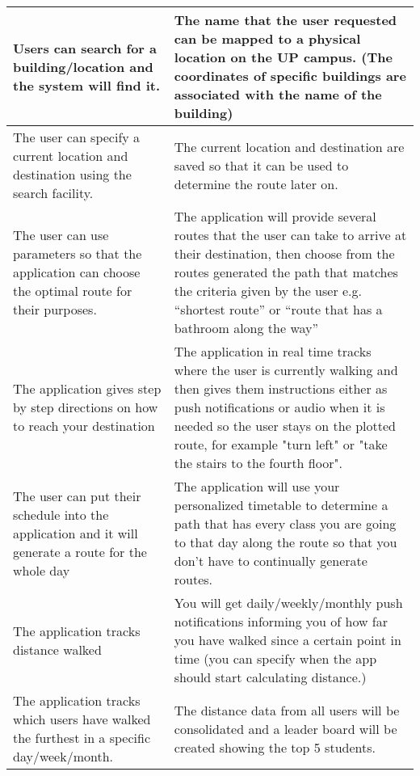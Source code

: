 \documentclass[a4paper,12pt]{article}
\begin{document}
\begin{table}[!htbp]
\begin{tabular}{|L|L|}
				\\
				\hline
				Users can search for a building/location and the system will find it. & The name that the user requested can be mapped to a physical location on the UP campus. (The coordinates of specific buildings are associated with the name of the building)
				\\
				\hline
				The user can specify a current location and destination using the search facility. & The current location and destination are saved so that it can be used to determine the route later on. 
				\\
				\hline
				The user can use parameters so that the application can choose the optimal route for their purposes. & The application will provide several routes that the user can take to arrive at their destination, then choose from the routes generated the path that matches the criteria given by the user e.g. “shortest route” or “route that has a bathroom along the way”
				\\
				\hline
				The application gives step by step directions on how to reach your destination & The application in real time tracks where the user is currently walking and then gives them instructions either as push notifications or audio when it is needed so the user stays on the plotted route, for example "turn left" or "take the stairs to the fourth floor". 
				\\
				\hline
				The user can put their schedule into the application and it will generate a route for the whole day & The application will use your personalized timetable to determine a path that has every class you are going to that day along the route so that you don’t have to continually generate routes.
				\\
				\hline
				The application tracks distance walked & You will get daily/weekly/monthly push notifications informing you of how far you have walked since a certain point in time (you can specify when the app should start calculating distance.)
				\\
				\hline
				The application tracks which users have walked the furthest in a specific day/week/month. & The distance data from all users will be consolidated and a leader board will be created showing the top 5 students.
				\\
				\hline
				
				
			\end{tabular}
			\egroup
			
		\end{table}
		
\end{document}
